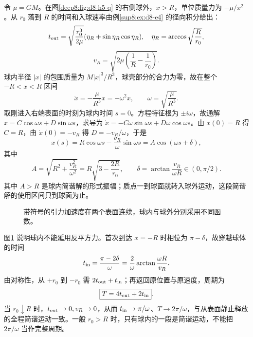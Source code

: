 \begin{solution}
令 $\mu=GM$。在图\ref{deep8:fig:d8-h5-q} 的右侧球外，$x>R$，单位质量力为 $-\mu/x^2$。从 $r_0$ 落到 $R$ 的时间和入球速率由例\ref{sup8:ex:d8-e4} 的径向积分给出：
\[
 t_{\rm out}=\sqrt{\frac{r_0^3}{2\mu}}(\eta_R+\sin\eta_R\cos\eta_R),
 \quad\eta_R=\arccos\sqrt{\frac R{r_0}},
\]
\[
 v_R=\sqrt{2\mu\left(\frac1R-\frac1{r_0}\right)}.
\]
球内半径 $|x|$ 的包围质量为 $M|x|^3/R^3$，球壳部分的合力为零，故在整个 $-R<x<R$ 区间
\[
 \ddot x=-\frac\mu{R^3}x=-\omega^2x,\qquad
 \omega=\sqrt{\frac\mu{R^3}}.
\]
取刚进入右端表面的时刻为球内时间 $s=0$。方程特征根为 $\pm i\omega$，故通解 $x=C\cos\omega s+D\sin\omega s$，求导为 $\dot x=-C\omega\sin\omega s+D\omega\cos\omega s$。由 $x(0)=R$ 得 $C=R$，由 $\dot x(0)=-v_R$ 得 $D=-v_R/\omega$，于是
\[
 x(s)=R\cos\omega s-\frac{v_R}{\omega}\sin\omega s
     =A\cos(\omega s+\delta),
\]
其中
\[
 A=\sqrt{R^2+\frac{v_R^2}{\omega^2}}
 =R\sqrt{3-\frac{2R}{r_0}},\qquad
 \delta=\arctan\frac{v_R}{\omega R}\in(0,\pi/2).
\]
其中 $A>R$ 是球内简谐解的形式振幅；质点一到球面就转入球外运动，这段简谐解的使用区间只到球面为止。
\begin{figure}[H]\centering
{}
\caption{带符号的引力加速度在两个表面连续，球内与球外分别采用不同函数。}\label{deep8:fig:d8-h5-s}
\end{figure}
图\ref{deep8:fig:d8-h5-s} 说明球内不能延用反平方力。首次到达 $x=-R$ 时相位为 $\pi-\delta$，故穿越球体的时间
\[
 t_{\rm in}=\frac{\pi-2\delta}{\omega}
 =\frac2\omega\arctan\frac{\omega R}{v_R}.
\]
由对称性，从 $+r_0$ 到 $-r_0$ 需 $2t_{\rm out}+t_{\rm in}$；再返回原位置与原速度，周期为
\[
 \boxed{T=4t_{\rm out}+2t_{\rm in}}.
\]
当 $r_0\downarrow R$ 时，$t_{\rm out}\to0,v_R\to0$，从而 $t_{\rm in}\to\pi/\omega$、$T\to2\pi/\omega$，与从表面静止释放的全程简谐运动一致。一般 $r_0>R$ 时，只有球内的一段是简谐运动，不能把 $2\pi/\omega$ 当作完整周期。
\end{solution}


